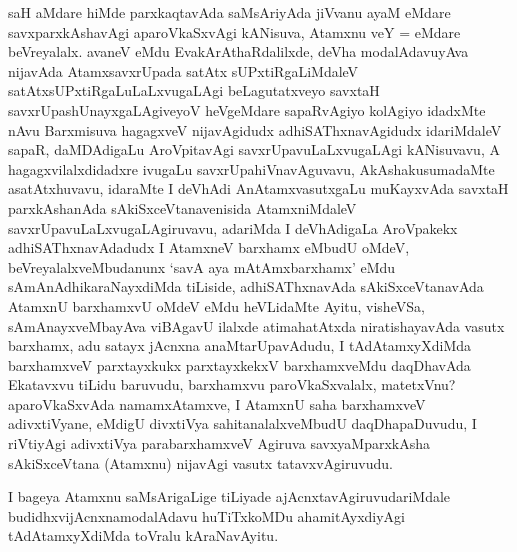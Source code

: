 \begin{artha}
saH aMdare hiMde parxkaqtavAda saMsAriyAda jiVvanu ayaM eMdare savxparxkAshavAgi aparoVkaSxvAgi kANisuva, Atamxnu veY = eMdare beVreyalalx. avaneV eMdu EvakArAthaRdalilxde, deVha modalAdavuyAva nijavAda AtamxsavxrUpada satAtx sUPxtiRgaLiMdaleV satAtxsUPxtiRgaLuLaLxvugaLAgi beLagutatxveyo savxtaH savxrUpashUnayxgaLAgiveyoV heVgeMdare sapaRvAgiyo kolAgiyo idadxMte nAvu Barxmisuva hagagxveV nijavAgidudx adhiSAThxnavAgidudx idariMdaleV sapaR, daMDAdigaLu AroVpitavAgi savxrUpavuLaLxvugaLAgi kANisuvavu, A hagagxvilalxdidadxre ivugaLu savxrUpahiVnavAguvavu, AkAshakusumadaMte asatAtxhuvavu, idaraMte I deVhAdi AnAtamxvasutxgaLu muKayxvAda savxtaH parxkAshanAda sAkiSxceVtanavenisida AtamxniMdaleV savxrUpavuLaLxvugaLAgiruvavu, adariMda I deVhAdigaLa AroVpakekx adhiSAThxnavAdadudx I AtamxneV barxhamx eMbudU oMdeV, beVreyalalxveMbudanunx `savA aya mAtAmxbarxhamx' eMdu sAmAnAdhikaraNayxdiMda tiLiside, adhiSAThxnavAda sAkiSxceVtanavAda AtamxnU barxhamxvU oMdeV eMdu heVLidaMte Ayitu, visheVSa, sAmAnayxveMbayAva viBAgavU ilalxde atimahatAtxda niratishayavAda vasutx barxhamx, adu satayx jAcnxna anaMtarUpavAdudu, I tAdAtamxyXdiMda barxhamxveV parxtayxkukx parxtayxkekxV barxhamxveMdu daqDhavAda Ekatavxvu tiLidu baruvudu, barxhamxvu paroVkaSxvalalx, matetxVnu?  aparoVkaSxvAda namamxAtamxve, I AtamxnU saha barxhamxveV adivxtiVyane, eMdigU divxtiVya sahitanalalxveMbudU daqDhapaDuvudu, I riVtiyAgi adivxtiVya parabarxhamxveV Agiruva savxyaMparxkAsha sAkiSxceVtana (Atamxnu) nijavAgi vasutx tatavxvAgiruvudu.
\end{artha}
\begin{artha}
I bageya Atamxnu saMsArigaLige tiLiyade ajAcnxtavAgiruvudariMdale budidhxvijAcnxnamodalAdavu huTiTxkoMDu ahamitAyxdiyAgi tAdAtamxyXdiMda toVralu kAraNavAyitu.
\end{artha}

